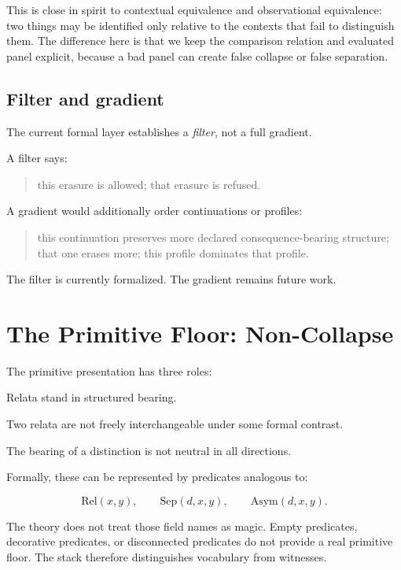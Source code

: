 \documentclass[11pt]{article}
\newcommand{\Rel}{\mathrm{Rel}}
\newcommand{\Sep}{\mathrm{Sep}}
\newcommand{\Asym}{\mathrm{Asym}}
\begin{document}
This is close in spirit to contextual equivalence and observational
equivalence: two things may be identified only relative to the contexts that
fail to distinguish them. The difference here is that we keep the comparison
relation and evaluated panel explicit, because a bad panel can create false
collapse or false separation.

\subsection{Filter and gradient}

The current formal layer establishes a \emph{filter}, not a full gradient.

A filter says:

\begin{quote}
this erasure is allowed; that erasure is refused.
\end{quote}

A gradient would additionally order continuations or profiles:

\begin{quote}
this continuation preserves more declared consequence-bearing structure; that
one erases more; this profile dominates that profile.
\end{quote}

The filter is currently formalized. The gradient remains future work.

\section{The Primitive Floor: Non-Collapse}

The primitive presentation has three roles:

\begin{description}[leftmargin=*]
  \item[Relation] Relata stand in structured bearing.
  \item[Distinction] Two relata are not freely interchangeable under some
  formal contrast.
  \item[Asymmetry] The bearing of a distinction is not neutral in all
  directions.
\end{description}

Formally, these can be represented by predicates analogous to:

\[
\Rel(x,y), \qquad \Sep(d,x,y), \qquad \Asym(d,x,y).
\]

The theory does not treat those field names as magic. Empty predicates,
decorative predicates, or disconnected predicates do not provide a real
primitive floor. The stack therefore distinguishes vocabulary from witnesses.
\end{document}
